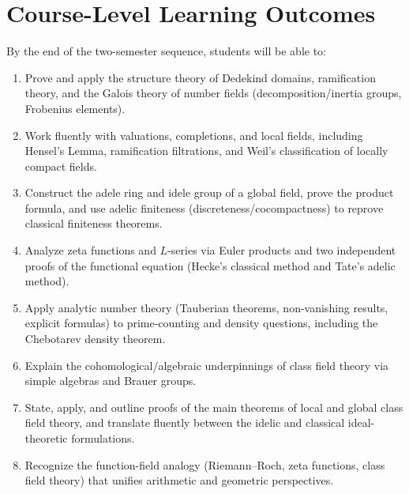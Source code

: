 \documentclass[11pt]{article}
\begin{document}
\section{Course-Level Learning Outcomes}
By the end of the two-semester sequence, students will be able to:
\begin{enumerate}[leftmargin=1.6cm]
\item Prove and apply the structure theory of Dedekind domains, ramification theory, and the Galois theory of number fields (decomposition/inertia groups, Frobenius elements).
\item Work fluently with valuations, completions, and local fields, including Hensel's Lemma, ramification filtrations, and Weil's classification of locally compact fields.
\item Construct the adele ring and idele group of a global field, prove the product formula, and use adelic finiteness (discreteness/cocompactness) to reprove classical finiteness theorems.
\item Analyze zeta functions and $L$-series via Euler products and two independent proofs of the functional equation (Hecke's classical method and Tate's adelic method).
\item Apply analytic number theory (Tauberian theorems, non-vanishing results, explicit formulas) to prime-counting and density questions, including the Chebotarev density theorem.
\item Explain the cohomological/algebraic underpinnings of class field theory via simple algebras and Brauer groups.
\item State, apply, and outline proofs of the main theorems of local and global class field theory, and translate fluently between the idelic and classical ideal-theoretic formulations.
\item Recognize the function-field analogy (Riemann--Roch, zeta functions, class field theory) that unifies arithmetic and geometric perspectives.
\end{enumerate}

\end{document}
